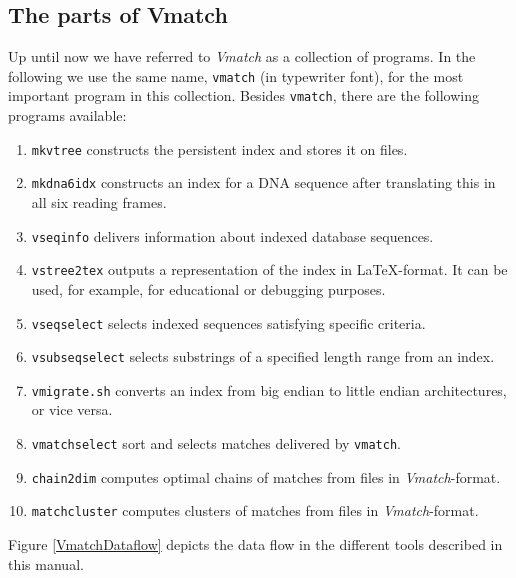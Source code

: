 \documentclass[12pt,titlepage]{article}
\begin{document}
\begin{AboutVmatch}
\subsection*{The parts of Vmatch}
Up until now we have referred to \emph{Vmatch} as a collection
of programs. In the following we use the same name, 
\texttt{vmatch} (in typewriter font), for the most important 
program in this collection. Besides \texttt{vmatch}, there are
the following programs available:
\begin{enumerate}
\item
\texttt{mkvtree} constructs the persistent index and stores it on files.
\item
\texttt{mkdna6idx} constructs an index for a DNA sequence 
after translating this in all six reading frames.
\item
\texttt{vseqinfo} delivers information about indexed database sequences.
\item
\texttt{vstree2tex} outputs a representation of the index
in \LaTeX-format. It can be used, for example, for educational
or debugging purposes.
\item
\texttt{vseqselect} selects indexed sequences satisfying specific
criteria.
\item
\texttt{vsubseqselect} selects substrings of a specified length range 
from an index. 
\item
\texttt{vmigrate.sh} converts an index from big endian to
little endian architectures, or vice versa.
\item
\texttt{vmatchselect} sort and selects matches 
delivered by \texttt{vmatch}.
\item
\texttt{chain2dim} computes optimal chains of matches from files
in \emph{Vmatch}-format.
\item
\texttt{matchcluster} computes clusters of matches from files
in \emph{Vmatch}-format.
\end{enumerate}


Figure \ref{VmatchDataflow} depicts the 
data flow in the different tools described
in this manual.


\end{AboutVmatch}
\end{document}
